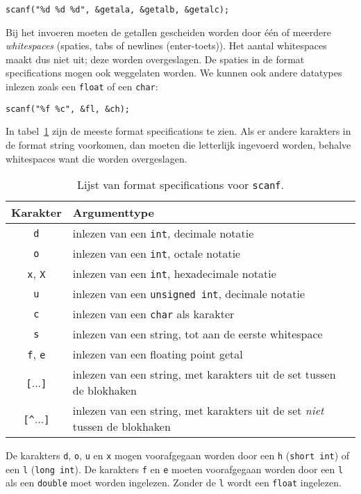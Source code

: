 \hspace*{1em}\texttt{scanf("\%d \%d \%d", \&getala, \&getalb, \&getalc);}

Bij het invoeren moeten de getallen gescheiden worden door één of meerdere \textsl{whitespaces} (spaties, tabs of newlines (enter-toets)). Het aantal whitespaces maakt dus niet uit; deze worden overgeslagen. De spaties in de format specifications mogen ook weggelaten worden. We kunnen ook andere datatypes inlezen zoals een \texttt{float} of een \texttt{char}:

\hspace*{1em}\texttt{scanf("\%f \%c", \&fl, \&ch);}

In tabel~\ref{tab:invscanf} zijn de meeste format specifications te zien. Als er andere karakters in de format string voorkomen, dan moeten die letterlijk ingevoerd worden, behalve whitespaces want die worden overgeslagen.

\begin{table}[!ht]
\centering
\caption{Lijst van format specifications voor \texttt{scanf}.}
\label{tab:invscanf}
\begin{tabular}{cl}
\toprule
Karakter & Argumenttype \\
\midrule 
\texttt{d} & inlezen van een \texttt{int}, decimale notatie\\
\texttt{o} & inlezen van een \texttt{int}, octale notatie\\
\texttt{x}, \texttt{X} & inlezen van een \texttt{int}, hexadecimale notatie\\
\texttt{u} & inlezen van een \texttt{unsigned int}, decimale notatie\\
\texttt{c} & inlezen van een \texttt{char} als karakter\\
\texttt{s} & inlezen van een string, tot aan de eerste whitespace\\
\texttt{f}, \texttt{e} & inlezen van een floating point getal\\
\texttt{[}...\texttt{]} & inlezen van een string, met karakters uit de set tussen de blokhaken\\
\texttt{[\textasciicircum}...\texttt{]} & inlezen van een string, met karakters uit de set \textsl{niet} tussen de blokhaken\\
\bottomrule
\end{tabular}
\end{table}

De karakters \texttt{d}, \texttt{o}, \texttt{u} en \texttt{x} mogen voorafgegaan worden door een \texttt{h} (\texttt{short int}) of een \texttt{l} (\texttt{long int}). De karakters \texttt{f} en \texttt{e} moeten voorafgegaan worden door een \texttt{l} als een \texttt{double} moet worden ingelezen. Zonder de \texttt{l} wordt een \texttt{float} ingelezen.

